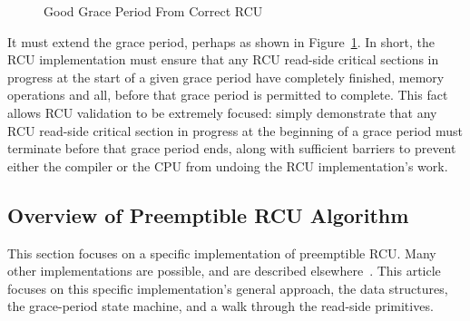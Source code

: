 \begin{figure}[htb]
\begin{center}
\end{center}
\caption{Good Grace Period From Correct RCU}
\label{app:rcuimpl:Good Grace Period From Correct RCU}
\end{figure}

It must extend the grace period, perhaps as shown in
Figure~\ref{app:rcuimpl:Good Grace Period From Correct RCU}.
In short, the RCU implementation must ensure that any
RCU read-side critical sections in progress at the start of a given grace
period have completely finished, memory operations and all, before that
grace period is permitted to complete.
This fact allows RCU validation to be extremely focused: simply demonstrate
that any RCU read-side critical section in progress at the beginning of
a grace period must terminate before that grace period ends, along with
sufficient barriers to prevent either the compiler or the CPU from undoing
the RCU implementation's work.

\subsection{Overview of Preemptible RCU Algorithm}
\label{app:rcuimpl:Overview of Preemptible RCU Algorithm}

This section focuses on a specific implementation of preemptible RCU.
Many other implementations are possible, and are described
elsewhere~\cite{PaulEMcKenney2006b,PaulMcKenney05b}.
This article focuses on this specific implementation's
general approach, the data structures,
the grace-period state machine, and a walk through the read-side primitives.

